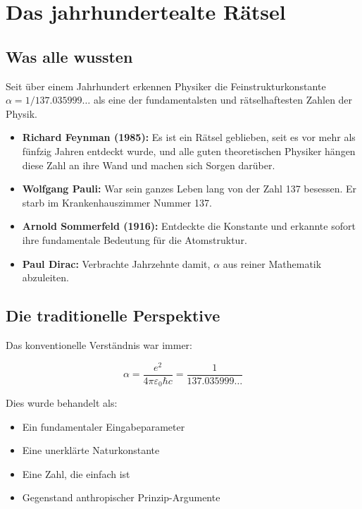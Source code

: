 	\section{Das jahrhundertealte Rätsel}
	
	\subsection{Was alle wussten}
	
	Seit über einem Jahrhundert erkennen Physiker die Feinstrukturkonstante $\alpha = 1/137.035999\ldots$ als eine der fundamentalsten und rätselhaftesten Zahlen der Physik.
	
	\begin{tcolorbox}[colback=yellow!5!white,colframe=yellow!75!black,title=Historische Anerkennung]
		\begin{itemize}
			\item \textbf{Richard Feynman (1985):} Es ist ein Rätsel geblieben, seit es vor mehr als fünfzig Jahren entdeckt wurde, und alle guten theoretischen Physiker hängen diese Zahl an ihre Wand und machen sich Sorgen darüber.
			
			\item \textbf{Wolfgang Pauli:} War sein ganzes Leben lang von der Zahl 137 besessen. Er starb im Krankenhauszimmer Nummer 137.
			
			\item \textbf{Arnold Sommerfeld (1916):} Entdeckte die Konstante und erkannte sofort ihre fundamentale Bedeutung für die Atomstruktur.
			
			\item \textbf{Paul Dirac:} Verbrachte Jahrzehnte damit, $\alpha$ aus reiner Mathematik abzuleiten.
		\end{itemize}
	\end{tcolorbox}
	
	\subsection{Die traditionelle Perspektive}
	
	Das konventionelle Verständnis war immer:
	
	\begin{equation}
		\alpha = \frac{e^2}{4\pi\varepsilon_0\hbar c} = \frac{1}{137.035999\ldots}
	\end{equation}
	
	Dies wurde behandelt als:
	\begin{itemize}
		\item Ein fundamentaler Eingabeparameter
		\item Eine unerklärte Naturkonstante
		\item Eine Zahl, die einfach ist
		\item Gegenstand anthropischer Prinzip-Argumente
	\end{itemize}
	
